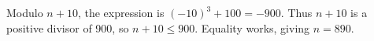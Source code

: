Modulo $n+10$, the expression is $(-10)^3+100=-900$. Thus $n+10$ is a positive divisor of 900, so $n+10\le900$. Equality works, giving $\boxed{n=890}$.
